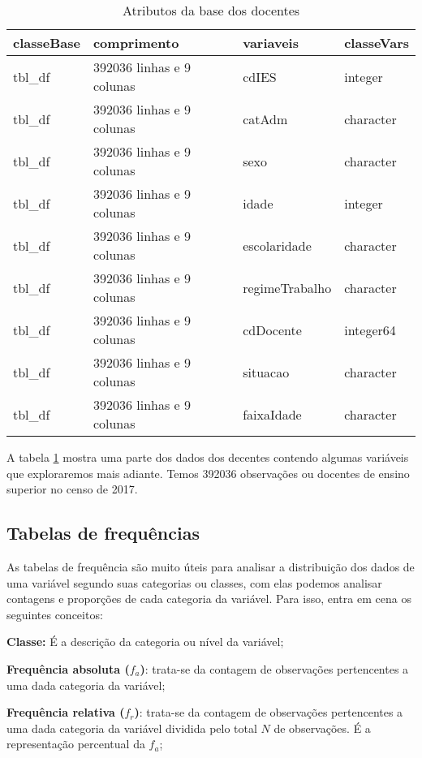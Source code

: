 \documentclass[12pt,]{style/krantz}
\theoremstyle{definition}
\theoremstyle{definition}
\theoremstyle{definition}
\theoremstyle{remark}
\begin{document}
\begin{table}[!h]

\caption{\label{tab:tab03}Atributos da base dos docentes}
\centering
\begin{tabular}{llll}
\toprule
classeBase & comprimento & variaveis & classeVars\\
\midrule
tbl\_df & 392036 linhas e 9 colunas & cdIES & integer\\
tbl\_df & 392036 linhas e 9 colunas & catAdm & character\\
tbl\_df & 392036 linhas e 9 colunas & sexo & character\\
tbl\_df & 392036 linhas e 9 colunas & idade & integer\\
tbl\_df & 392036 linhas e 9 colunas & escolaridade & character\\
\addlinespace
tbl\_df & 392036 linhas e 9 colunas & regimeTrabalho & character\\
tbl\_df & 392036 linhas e 9 colunas & cdDocente & integer64\\
tbl\_df & 392036 linhas e 9 colunas & situacao & character\\
tbl\_df & 392036 linhas e 9 colunas & faixaIdade & character\\
\bottomrule
\end{tabular}
\end{table}

A tabela \ref{tab:tab03} mostra uma parte dos dados dos decentes
contendo algumas variáveis que exploraremos mais adiante. Temos 392036
observações ou docentes de ensino superior no censo de 2017.

\subsection{Tabelas de frequências}\label{tabelas-de-frequencias}

As tabelas de frequência são muito úteis para analisar a distribuição
dos dados de uma variável segundo suas categorias ou classes, com elas
podemos analisar contagens e proporções de cada categoria da variável.
Para isso, entra em cena os seguintes conceitos:

\textbf{Classe:} É a descrição da categoria ou nível da variável;

\textbf{Frequência absoluta (\(f_{a}\))}: trata-se da contagem de
observações pertencentes a uma dada categoria da variável;

\textbf{Frequência relativa (\(f_{r}\))}: trata-se da contagem de
observações pertencentes a uma dada categoria da variável dividida pelo
total \(N\) de observações. É a representação percentual da \(f_{a}\);
\end{document}

